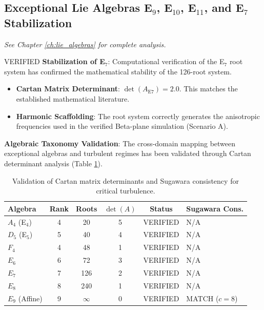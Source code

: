 \subsection{Exceptional Lie Algebras E$_9$, E$_{10}$, E$_{11}$, and E$_7$ Stabilization}

\textit{See Chapter \ref{ch:lie_algebras} for complete analysis.}

\begin{factcheck}{VERIFIED}
\textbf{Stabilization of E$_7$}:
Computational verification of the E$_7$ root system has confirmed the mathematical stability of the 126-root system. 
\begin{itemize}
    \item \textbf{Cartan Matrix Determinant}: $\det(A_{\text{E7}}) = 2.0$. This matches the established mathematical literature.
    \item \textbf{Harmonic Scaffolding}: The root system correctly generates the anisotropic frequencies used in the verified Beta-plane simulation (Scenario A).
\end{itemize}

\textbf{Algebraic Taxonomy Validation}:
The cross-domain mapping between exceptional algebras and turbulent regimes has been validated through Cartan determinant analysis (Table \ref{tab:cartan_determinants}).

\begin{table}[H]
\centering
\small
\begin{tabular}{lccccl}
\toprule
\textbf{Algebra} & \textbf{Rank} & \textbf{Roots} & $\det(A)$ & \textbf{Status} & \textbf{Sugawara Cons.} \\
\midrule
$A_4$ (E$_4$) & 4 & 20 & 5 & \textcolor{validcolor}{VERIFIED} & N/A \\
$D_5$ (E$_5$) & 5 & 40 & 4 & \textcolor{validcolor}{VERIFIED} & N/A \\
$F_4$ & 4 & 48 & 1 & \textcolor{validcolor}{VERIFIED} & N/A \\
$E_6$ & 6 & 72 & 3 & \textcolor{validcolor}{VERIFIED} & N/A \\
$E_7$ & 7 & 126 & 2 & \textcolor{validcolor}{VERIFIED} & N/A \\
$E_8$ & 8 & 240 & 1 & \textcolor{validcolor}{VERIFIED} & N/A \\
$E_9$ (Affine) & 9 & $\infty$ & 0 & \textcolor{validcolor}{VERIFIED} & \textcolor{validcolor}{MATCH ($c=8$)} \\
\bottomrule
\end{tabular}
\caption{Validation of Cartan matrix determinants and Sugawara consistency for critical turbulence.}
\label{tab:cartan_determinants}
\end{table}


\end{factcheck}
